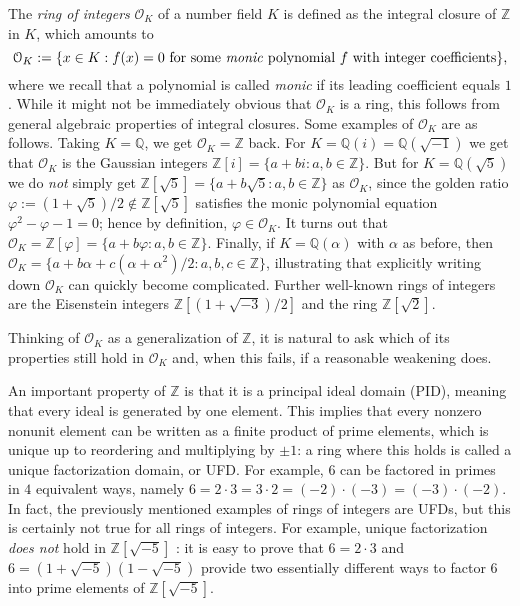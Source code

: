 \documentclass[a4paper,USenglish,cleveref, autoref, thm-restate]{lipics-v2021}
\newcommand*{\OK}[1][K]{\mathcal{O}_{#1}}
\newcommand{\Q}{\mathbb{Q}}
\newcommand{\Z}{\mathbb{Z}}
\begin{document}
The \emph{ring of integers} $\OK$ of a number field $K$ is defined as the integral closure of $\Z$ in $K$, which amounts to
\[
  \OK := \{x \in K : f(x)=0 \text{ for some \emph{monic} polynomial } f \text{ with integer coefficients}\},\]
where we recall that a polynomial is called \emph{monic} if its leading coefficient equals $1$.
While it might not be immediately obvious that $\OK$ is a ring, this follows from general algebraic properties of integral closures.
Some examples of $\OK$ are as follows. Taking $K=\Q$, we get $\OK=\Z$ back.
For $K=\Q(i)=\Q(\sqrt{-1})$ we get that $\OK$ is the Gaussian integers $\Z[i]=\{a+bi : a,b \in \Z\}$.
But for $K=\Q(\sqrt{5})$ we do \emph{not} simply get $\Z[\sqrt{5}]=\{a+b\sqrt{5} : a,b \in \Z\}$ as $\OK$, since the golden ratio $\varphi:=(1+\sqrt{5})/2\not\in \Z[\sqrt{5}]$ satisfies the monic polynomial equation $\varphi^2-\varphi-1=0$; hence by definition, $\varphi \in \OK$.
It turns out that $\OK=\Z[\varphi]=\{a+b\varphi : a,b \in \Z\}$.
Finally, if $K=\Q(\alpha)$ with $\alpha$ as before, then $\OK=\{a+b \alpha+c (\alpha+\alpha^2)/2 : a,b,c \in \Z\}$, illustrating that explicitly writing down $\OK$ can quickly become complicated.
Further well-known rings of integers are %
the Eisenstein integers $\Z[(1+\sqrt{-3})/2]$ and the ring $\Z[\sqrt{2}]$.

Thinking of $\OK$ as a generalization of $\Z$, it is natural to ask which of its properties %
still hold in $\OK$ and, when this fails, if a reasonable weakening does. %

An important property of $\Z$ is that it is a principal ideal domain (PID), meaning that every ideal is generated by one element. This implies that every nonzero nonunit element can be written as a %
finite product of prime elements, which is unique up to reordering and multiplying by $\pm 1$: a ring where this holds is called a unique factorization domain, or UFD. %
For example, $6$ can be factored in primes in $4$ equivalent ways, namely $6=2\cdot 3=3\cdot2=(-2)\cdot (-3)=(-3) \cdot (-2)$.
In fact, the previously mentioned examples of rings of integers are UFDs, but this is certainly not true for all rings of integers. For example, unique factorization \emph{does not} hold in $\Z[\sqrt{-5}]$%
: it is easy to prove that $6=2\cdot3$ and $6=(1+\sqrt{-5}) (1-\sqrt{-5})$ provide two essentially different ways to factor $6$ into prime elements of $\Z[\sqrt{-5}]$.
\end{document}
